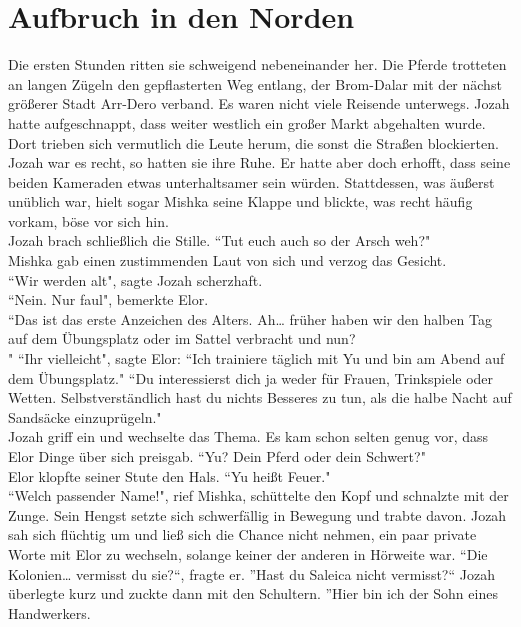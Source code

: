 \chapter{Aufbruch in den Norden}


Die ersten Stunden ritten sie schweigend nebeneinander her. Die Pferde trotteten an langen Zügeln 
den gepflasterten Weg entlang, der Brom-Dalar mit der nächst größerer Stadt Arr-Dero verband. Es 
waren nicht viele Reisende unterwegs. Jozah hatte aufgeschnappt, dass weiter westlich ein großer 
Markt abgehalten wurde. Dort trieben sich vermutlich die Leute herum, die sonst die Straßen 
blockierten. Jozah war es recht, so hatten sie ihre Ruhe. Er hatte aber doch erhofft, dass seine 
beiden Kameraden etwas unterhaltsamer sein würden. Stattdessen, was äußerst unüblich war, hielt 
sogar Mishka seine Klappe und blickte, was recht häufig vorkam, böse vor sich hin. \\
Jozah brach schließlich die Stille. ``Tut euch auch so der Arsch weh?"\\
Mishka gab einen zustimmenden Laut von sich und verzog das Gesicht. \\
``Wir werden alt", sagte Jozah scherzhaft.\\
``Nein. Nur faul", bemerkte Elor.\\
``Das ist das erste Anzeichen des Alters. Ah… früher haben wir den halben Tag auf dem Übungsplatz 
oder im Sattel verbracht und nun?\\"
``Ihr vielleicht", sagte Elor: ``Ich trainiere täglich mit Yu und bin am Abend auf dem Übungsplatz."
``Du interessierst dich ja weder für Frauen, Trinkspiele oder Wetten. Selbstverständlich hast du 
nichts Besseres zu tun, als die halbe Nacht auf Sandsäcke einzuprügeln."\\
Jozah griff ein und wechselte das Thema. Es kam schon selten genug vor, dass Elor Dinge über sich 
preisgab. ``Yu? Dein Pferd oder dein Schwert?"\\
Elor klopfte seiner Stute den Hals. ``Yu heißt Feuer."\\
``Welch passender Name!", rief Mishka, schüttelte den Kopf und schnalzte mit der Zunge. Sein Hengst 
setzte sich schwerfällig in Bewegung und trabte davon. Jozah sah sich flüchtig um und ließ sich die 
Chance nicht nehmen, ein paar private Worte mit Elor zu wechseln, solange keiner der anderen in 
Hörweite war.
``Die Kolonien… vermisst du sie?``, fragte er.
''Hast du Saleica nicht vermisst?``
Jozah überlegte kurz und zuckte dann mit den Schultern. ''Hier bin ich der Sohn eines Handwerkers. 
